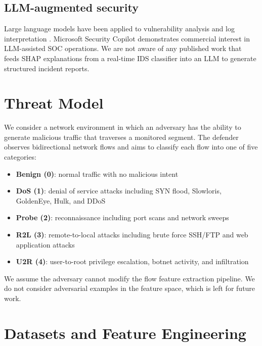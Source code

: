 \documentclass[review]{elsarticle}  %
\begin{document}
\subsection{LLM-augmented security}

Large language models have been applied to vulnerability analysis
\cite{ref17} and log interpretation \cite{ref18}.
Microsoft Security Copilot \cite{ref19} demonstrates commercial
interest in LLM-assisted SOC operations. We are not aware of
any published work that feeds SHAP explanations from a real-time
IDS classifier into an LLM to generate structured incident reports.

\section{Threat Model}
\label{sec:threat}

We consider a network environment in which an adversary has the
ability to generate malicious traffic that traverses a monitored
segment. The defender observes bidirectional network flows and
aims to classify each flow into one of five categories:

\begin{itemize}
    \item \textbf{Benign (0)}: normal traffic with no malicious intent
    \item \textbf{DoS (1)}: denial of service attacks including SYN
          flood, Slowloris, GoldenEye, Hulk, and DDoS
    \item \textbf{Probe (2)}: reconnaissance including port scans
          and network sweeps
    \item \textbf{R2L (3)}: remote-to-local attacks including
          brute force SSH/FTP and web application attacks
    \item \textbf{U2R (4)}: user-to-root privilege escalation,
          botnet activity, and infiltration
\end{itemize}

We assume the adversary cannot modify the flow feature extraction
pipeline. We do not consider adversarial examples in the feature
space, which is left for future work.

\section{Datasets and Feature Engineering}
\label{sec:dataset}
\end{document}
